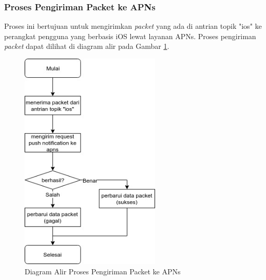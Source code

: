\subsubsection{Proses Pengiriman Packet ke APNs}
\par Proses ini bertujuan untuk mengirimkan \textit{packet} yang ada di antrian topik "ios" ke perangkat pengguna yang berbasis iOS lewat layanan APNs. Proses pengiriman \textit{packet} dapat dilihat di diagram alir pada
Gambar \ref{flowchart_pengiriman_packet_ke_apns}.
\begin{figure}[hb]
	\caption{Diagram Alir Proses Pengiriman Packet ke APNs} \label{flowchart_pengiriman_packet_ke_apns}
    \centering\includegraphics[width=0.6\textwidth]{bab3/figures/flowchart_pengiriman_packet_ke_apns.jpg}
\end{figure}

